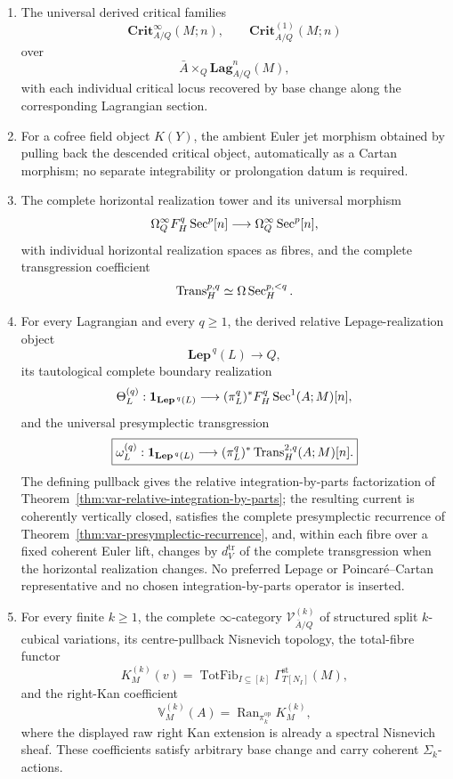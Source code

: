 \begin{theorem}
\begin{enumerate}
\item The universal derived critical families
\[
    \mathbf{Crit}^{\infty}_{A/Q}(M;n),
    \qquad
    \mathbf{Crit}^{(1)}_{A/Q}(M;n)
\]
over
\[
    \bar A\times_Q\mathbf{Lag}^n_{A/Q}(M),
\]
with each individual critical locus recovered by base change along the corresponding Lagrangian section.

\item For a cofree field object \(K(Y)\), the ambient Euler jet morphism obtained by pulling back the descended critical object, automatically as a Cartan morphism; no separate integrability or prolongation datum is required.

\item The complete horizontal realization tower and its universal morphism
\[
    \Omega_Q^\infty F_H^q\operatorname{Sec}^p[n]
    \longrightarrow
    \Omega_Q^\infty\operatorname{Sec}^p[n],
\]
with individual horizontal realization spaces as fibres, and the complete transgression coefficient
\[
    \operatorname{Trans}_{H}^{p,q}
    \simeq
    \Omega\operatorname{Sec}_H^{p,<q}.
\]

\item For every Lagrangian and every \(q\ge1\), the derived relative Lepage-realization object
\[
    \boxed{
    \mathbf{Lep}^{\,q}(L)
    \longrightarrow Q,
    }
\]
its tautological complete boundary realization
\[
    \Theta_L^{(q)}:
    \mathbf 1_{\mathbf{Lep}^{\,q}(L)}
    \longrightarrow
    (\pi_L^q)^*F_H^q\operatorname{Sec}^1(A;M)[n],
\]
and the universal presymplectic transgression
\[
    \boxed{
    \omega_L^{(q)}:
    \mathbf 1_{\mathbf{Lep}^{\,q}(L)}
    \longrightarrow
    (\pi_L^q)^*\operatorname{Trans}_{H}^{2,q}(A;M)[n].
    }
\]
The defining pullback gives the relative integration-by-parts factorization of Theorem~\ref{thm:var-relative-integration-by-parts}; the resulting current is coherently vertically closed, satisfies the complete presymplectic recurrence of Theorem~\ref{thm:var-presymplectic-recurrence}, and, within each fibre over a fixed coherent Euler lift, changes by \(d_V^{\mathrm{tr}}\) of the complete transgression when the horizontal realization changes.  No preferred Lepage or Poincar\'e--Cartan representative and no chosen integration-by-parts operator is inserted.

\item For every finite \(k\ge1\), the complete \(\infty\)-category \(\mathcal V^{(k)}_{\bar A/Q}\) of structured split \(k\)-cubical variations, its centre-pullback Nisnevich topology, the total-fibre functor
\[
    K_M^{(k)}(v)
    =
    \operatorname{TotFib}_{I\subseteq[k]}
    \Gamma_{T[N_I]}^{\mathrm{st}}(M),
\]
and the right-Kan coefficient
\[
    \boxed{
    \mathbb V_M^{(k)}(A)
    =
    \operatorname{Ran}_{\pi_k^{\mathrm{op}}}K_M^{(k)},
    }
\]
where the displayed raw right Kan extension is already a spectral Nisnevich sheaf. These coefficients satisfy arbitrary base change and carry coherent \(\Sigma_k\)-actions.


\end{enumerate}
\end{theorem}
